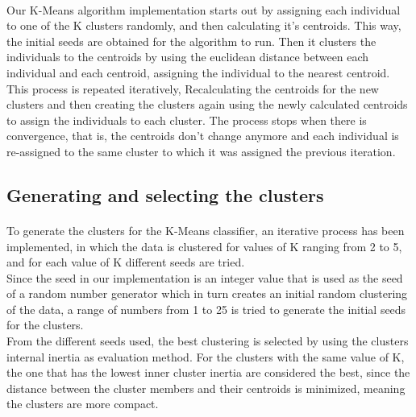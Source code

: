 \documentclass[12pt, a4paper]{article}
\begin{document}
\paragraph{}Our K-Means algorithm implementation starts out by assigning each individual to one of the K clusters randomly, and then calculating it's centroids. This way, the initial seeds are obtained for the algorithm to run. Then it clusters the individuals to the centroids by using the euclidean distance between each individual and each centroid, assigning the individual to the nearest centroid.\\

This process is repeated iteratively, Recalculating the centroids for the new clusters and then creating the clusters again using the newly calculated centroids to assign the individuals to each cluster. The process stops when there is convergence, that is, the centroids don't change anymore and each individual is re-assigned to the same cluster to which it was assigned the previous iteration.

\subsection{Generating and selecting the clusters} %
\label{sub:generating_and_selecting_the_clusters}
\paragraph{}To generate the clusters for the K-Means classifier, an iterative process has been implemented, in which the data is clustered for values of K ranging from 2 to 5, and for each value of K different seeds are tried.\\

Since the seed in our implementation is an integer value that is used as the seed of a random number generator which in turn creates an initial random clustering of the data, a range of numbers from 1 to 25  is tried to generate the initial seeds for the clusters.\\

From the different seeds used, the best clustering is selected by using the clusters internal inertia as evaluation method. For the clusters with the same value of K, the one that has the lowest inner cluster inertia are considered the best, since the distance between the cluster members and their centroids is minimized, meaning the clusters are more compact.\\
\end{document}
